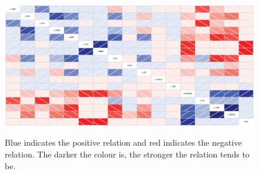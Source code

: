 \documentclass{bmcart}
\begin{document}
\begin{backmatter}
\begin{figure}[h!]
\centering
{}
\caption{
             }
\label{fixedtree}
\end{figure}

\begin{figure}[h!]
\includegraphics[width=12cm]{rateandtime.eps}\\
\caption{
             Blue indicates the positive relation and red indicates the negative relation. The darker the colour is, the stronger the relation tends to be.}
\label{correlation}
\end{figure}

\end{backmatter}
\end{document}

